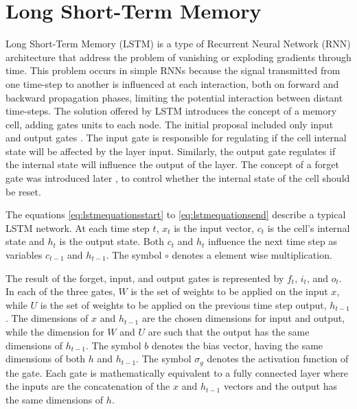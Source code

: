 \section{\label{sec:lstm}Long Short-Term Memory}
Long Short-Term Memory\cite{hochreiter_long_1997} (LSTM) is a type of Recurrent Neural Network (RNN) architecture that address the problem of vanishing or exploding gradients through time. This problem occurs in simple RNNs because the signal transmitted from one time-step to another is influenced at each interaction, both on forward and backward propagation phases, limiting the potential interaction between distant time-steps. The solution offered by LSTM introduces the concept of a memory cell, adding gates units to each node. The initial proposal included only input and output gates \cite{hochreiter_long_1997}.
The input gate is responsible for regulating if the cell internal state will be affected by the layer input. Similarly, the output gate regulates if the internal state will influence the output of the layer. The concept of a forget gate was introduced later \cite{gers_learning_1999}, to control whether the internal state of the cell should be reset.

The equations \eqref{eq:lstmequationsstart} to \eqref{eq:lstmequationsend} describe a typical LSTM network. At each time step $t$, $x_t$ is the input vector, $c_t$ is the cell's internal state and $h_t$ is the output state. Both $c_t$ and $h_t$ influence the next time step as variables $c_{t-1}$ and $h_{t-1}$. The symbol $\circ$ denotes a element wise multiplication.

The result of the forget, input, and output gates is represented by $f_t$, $i_t$, and $o_t$.
In each of the three gates, $W$ is the set of weights to be applied on the input $x$, while $U$ is the set of weights to be applied on the previous time step output, $h_{t-1}$. The dimensions of $x$ and $h_{t-1}$ are the chosen dimensions for input and output, while the dimension for $W$ and $U$ are such that the output has the same dimensions of $h_{t-1}$.  The symbol $b$ denotes the bias vector, having the same dimensions of both $h$ and $h_{t-1}$. The symbol $\sigma_g$ denotes the activation function of the gate. Each gate is mathematically equivalent to a fully connected layer where the inputs are the concatenation of the $x$ and $h_{t-1}$ vectors and the output has the same dimensions of $h$.

